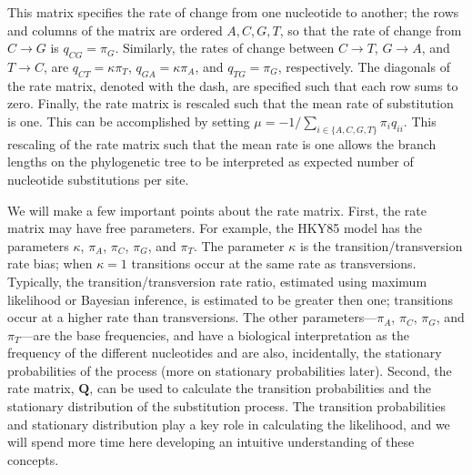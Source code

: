 \documentclass{svmult}
\begin{document}
This matrix specifies the rate of change from one nucleotide to another; the rows and columns of
the matrix are ordered $A, C, G, T$, so that the rate of change from $C \rightarrow G$ is $q_{CG} =
\pi_G$. Similarly, the rates of change between $C \rightarrow T$, $G \rightarrow A$, and $T
\rightarrow C$, are $q_{CT} = \kappa \pi_T$, $q_{GA} = \kappa \pi_A$, and $q_{TG} = \pi_G$,
respectively.  The diagonals of the rate matrix, denoted with the dash, are specified such that
each row sums to zero. Finally, the rate matrix is rescaled such that the mean rate of substitution
is one. This can be accomplished by setting $\mu = -1 / \sum_{i\in \{A,C,G,T\}} \pi_i q_{ii}$. This
rescaling of the rate matrix such that the mean rate is one allows the branch lengths on the
phylogenetic tree to be interpreted as expected number of nucleotide substitutions per site.

We will make a few important points about the rate matrix. First, the rate matrix may have free
parameters. For example, the HKY85 model has the parameters $\kappa$, $\pi_A$, $\pi_C$, $\pi_G$,
and $\pi_T$.  The parameter $\kappa$ is the transition/transversion rate bias; when $\kappa = 1$
transitions occur at the same rate as transversions.  Typically, the transition/transversion rate
ratio, estimated using maximum likelihood or Bayesian inference, is estimated to be greater then
one; transitions occur at a higher rate than transversions.  The other parameters---$\pi_A$,
$\pi_C$, $\pi_G$, and $\pi_T$---are the base frequencies, and have a biological interpretation as
the frequency of the different nucleotides and are also, incidentally, the stationary probabilities
of the process (more on stationary probabilities later).  Second, the rate matrix, ${\mathbf Q}$,
can be used to calculate the transition probabilities and the stationary distribution of the
substitution process. The transition probabilities and stationary distribution play a key role in
calculating the likelihood, and we will spend more time here developing an intuitive understanding
of these concepts.
\end{document}
